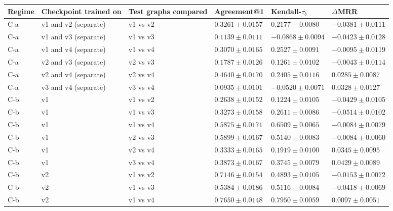 \begin{table}[htbp]
\centering
\small
\renewcommand{\arraystretch}{1.15}
\setlength{\tabcolsep}{5pt}
\begin{adjustbox}{max width=\linewidth}
\begin{tabular}{|l|l|l|l|l|l|}
\hline
\textbf{Regime} & \textbf{Checkpoint trained on} & \textbf{Test graphs compared} & \textbf{Agreement@1} & \textbf{Kendall-$\tau_b$} & \textbf{$\Delta$MRR} \\
\hline
C-a & v1 and v2 (separate) & v1 vs v2 & $0.3261 \pm 0.0157$ & $0.2177 \pm 0.0080$ & $-0.0381 \pm 0.0111$ \\
\hline
C-a & v1 and v3 (separate) & v1 vs v3 & $0.1139 \pm 0.0111$ & $-0.0868 \pm 0.0094$ & $-0.0423 \pm 0.0128$ \\
\hline
C-a & v1 and v4 (separate) & v1 vs v4 & $0.3070 \pm 0.0165$ & $0.2527 \pm 0.0091$ & $-0.0095 \pm 0.0119$ \\
\hline
C-a & v2 and v3 (separate) & v2 vs v3 & $0.1787 \pm 0.0126$ & $0.1261 \pm 0.0102$ & $-0.0043 \pm 0.0114$ \\
\hline
C-a & v2 and v4 (separate) & v2 vs v4 & $0.4640 \pm 0.0170$ & $0.2405 \pm 0.0116$ & $0.0285 \pm 0.0087$ \\
\hline
C-a & v3 and v4 (separate) & v3 vs v4 & $0.0935 \pm 0.0101$ & $-0.0520 \pm 0.0071$ & $0.0328 \pm 0.0127$ \\
\hline
C-b & v1 & v1 vs v2 & $0.2638 \pm 0.0152$ & $0.1224 \pm 0.0105$ & $-0.0429 \pm 0.0105$ \\
\hline
C-b & v1 & v1 vs v3 & $0.3273 \pm 0.0158$ & $0.2611 \pm 0.0086$ & $-0.0514 \pm 0.0102$ \\
\hline
C-b & v1 & v1 vs v4 & $0.5875 \pm 0.0171$ & $0.6509 \pm 0.0065$ & $-0.0084 \pm 0.0079$ \\
\hline
C-b & v1 & v2 vs v3 & $0.5899 \pm 0.0167$ & $0.5140 \pm 0.0083$ & $-0.0084 \pm 0.0060$ \\
\hline
C-b & v1 & v2 vs v4 & $0.3333 \pm 0.0165$ & $0.1919 \pm 0.0100$ & $0.0345 \pm 0.0095$ \\
\hline
C-b & v1 & v3 vs v4 & $0.3873 \pm 0.0167$ & $0.3745 \pm 0.0079$ & $0.0429 \pm 0.0089$ \\
\hline
C-b & v2 & v1 vs v2 & $0.7146 \pm 0.0154$ & $0.4893 \pm 0.0105$ & $-0.0153 \pm 0.0072$ \\
\hline
C-b & v2 & v1 vs v3 & $0.5384 \pm 0.0186$ & $0.5116 \pm 0.0084$ & $-0.0418 \pm 0.0069$ \\
\hline
C-b & v2 & v1 vs v4 & $0.7650 \pm 0.0148$ & $0.7950 \pm 0.0059$ & $0.0097 \pm 0.0051$ \\

\end{tabular}
\end{adjustbox}
\end{table}
